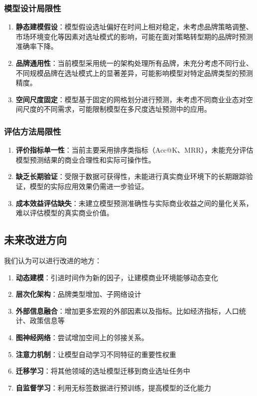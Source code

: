 \documentclass{article}
\begin{document}
\subsubsection{模型设计局限性}

\begin{enumerate}
\item \textbf{静态建模假设}：模型假设选址偏好在时间上相对稳定，未考虑品牌策略调整、市场环境变化等因素对选址模式的影响，可能在面对策略转型期的品牌时预测准确率下降。

\item \textbf{品牌通用性}：当前模型采用统一的架构处理所有品牌，未充分考虑不同行业、不同规模品牌在选址模式上的显著差异，可能影响模型对特定品牌类型的预测精度。

\item \textbf{空间尺度固定}：模型基于固定的网格划分进行预测，未考虑不同商业业态对空间尺度的不同需求，可能限制模型在多尺度选址预测中的应用。
\end{enumerate}

\subsubsection{评估方法局限性}

\begin{enumerate}
\item \textbf{评价指标单一性}：当前主要采用排序类指标（Acc@K、MRR），未能充分评估模型预测结果的商业合理性和实际可操作性。

\item \textbf{缺乏长期验证}：受限于数据可获得性，未能进行真实商业环境下的长期跟踪验证，模型的实际应用效果仍需进一步验证。

\item \textbf{成本效益评估缺失}：未建立模型预测准确性与实际商业收益之间的量化关系，难以评估模型的真实商业价值。
\end{enumerate}

\subsection{未来改进方向}

我们认为可以进行改进的地方：

\begin{enumerate}
\item \textbf{动态建模}：引进时间作为新的因子，让建模商业环境能够动态变化
\item \textbf{层次化架构}：品牌类型增加、子网络设计
\item \textbf{外部信息融合}：增加更多宏观的外部因素以及指标。比如经济指标，人口统计、政策信息等
\item \textbf{图神经网络}：尝试增加空间上的邻接关系。
\item \textbf{注意力机制}：让模型自动学习不同特征的重要性权重
\item \textbf{迁移学习}：将其他领域的选址模型迁移到商业选址任务中
\item \textbf{自监督学习}：利用无标签数据进行预训练，提高模型的泛化能力
\end{enumerate}
\end{document}
